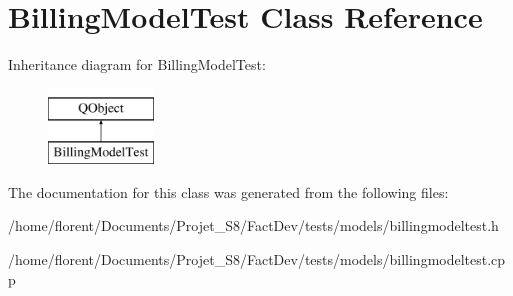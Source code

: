 \hypertarget{classBillingModelTest}{\section{Billing\-Model\-Test Class Reference}
\label{classBillingModelTest}
}
Inheritance diagram for Billing\-Model\-Test\-:\begin{figure}[H]
\begin{center}
\leavevmode
\includegraphics[height=2.000000cm]{dc/d0c/classBillingModelTest}
\end{center}
\end{figure}


The documentation for this class was generated from the following files\-:\begin{DoxyCompactItemize}
\item 
/home/florent/\-Documents/\-Projet\-\_\-\-S8/\-Fact\-Dev/tests/models/billingmodeltest.\-h\item 
/home/florent/\-Documents/\-Projet\-\_\-\-S8/\-Fact\-Dev/tests/models/billingmodeltest.\-cpp\end{DoxyCompactItemize}

